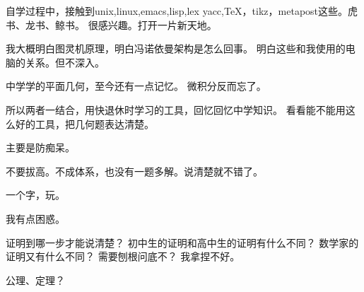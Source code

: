\documentclass[11pt]{article}
\begin{document}
自学过程中，接触到unix,linux,emacs,lisp,lex yacc,TeX，tikz，metapost这些。虎书、龙书、鲸书。
很感兴趣。打开一片新天地。

我大概明白图灵机原理，明白冯诺依曼架构是怎么回事。
明白这些和我使用的电脑的关系。但不深入。

中学学的平面几何，至今还有一点记忆。
微积分反而忘了。


所以两者一结合，用快退休时学习的工具，回忆回忆中学知识。
看看能不能用这么好的工具，把几何题表达清楚。

主要是防痴呆。

不要拔高。不成体系，也没有一题多解。说清楚就不错了。

一个字，玩。

我有点困惑。

证明到哪一步才能说清楚？
初中生的证明和高中生的证明有什么不同？
数学家的证明又有什么不同？
需要刨根问底不？
我拿捏不好。

公理、定理？

\fi





































 






















































































\end{document}

